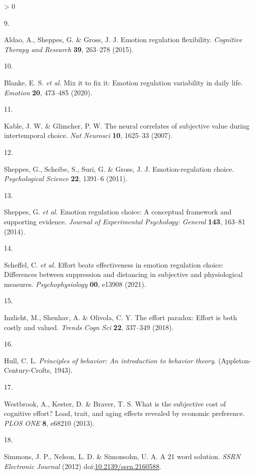 \documentclass[
  english,
  man,floatsintext]{apa6}
\newlength{\cslhangindent}
\newlength{\csllabelwidth}
\newenvironment{CSLReferences}[2] %
 {%
  \setlength{\parindent}{0pt}
  \ifodd #1 \everypar{\setlength{\hangindent}{\cslhangindent}}\ignorespaces\fi
  \ifnum #2 > 0
  \setlength{\parskip}{#2\baselineskip}
  \fi
 }%
 {}
\newcommand{\CSLLeftMargin}[1]{\parbox[t]{\csllabelwidth}{#1}}
\newcommand{\CSLRightInline}[1]{\parbox[t]{\linewidth - \csllabelwidth}{#1}\break}
\begin{document}
\begin{CSLReferences}{0}{0}
\leavevmode\hypertarget{ref-Aldao2015}{}%
\CSLLeftMargin{9. }
\CSLRightInline{Aldao, A., Sheppes, G. \& Gross, J. J. Emotion regulation flexibility. \emph{Cognitive Therapy and Research} \textbf{39}, 263--278 (2015).}

\leavevmode\hypertarget{ref-Blanke2020}{}%
\CSLLeftMargin{10. }
\CSLRightInline{Blanke, E. S. \emph{et al.} Mix it to fix it: Emotion regulation variability in daily life. \emph{Emotion} \textbf{20}, 473--485 (2020).}

\leavevmode\hypertarget{ref-Kable2007}{}%
\CSLLeftMargin{11. }
\CSLRightInline{Kable, J. W. \& Glimcher, P. W. The neural correlates of subjective value during intertemporal choice. \emph{Nat Neurosci} \textbf{10}, 1625--33 (2007).}

\leavevmode\hypertarget{ref-Sheppes2011}{}%
\CSLLeftMargin{12. }
\CSLRightInline{Sheppes, G., Scheibe, S., Suri, G. \& Gross, J. J. Emotion-regulation choice. \emph{Psychological Science} \textbf{22}, 1391--6 (2011).}

\leavevmode\hypertarget{ref-Sheppes2014}{}%
\CSLLeftMargin{13. }
\CSLRightInline{Sheppes, G. \emph{et al.} Emotion regulation choice: A conceptual framework and supporting evidence. \emph{Journal of Experimental Psychology: General} \textbf{143}, 163--81 (2014).}

\leavevmode\hypertarget{ref-Scheffel2021}{}%
\CSLLeftMargin{14. }
\CSLRightInline{Scheffel, C. \emph{et al.} Effort beats effectiveness in emotion regulation choice: Differences between suppression and distancing in subjective and physiological measures. \emph{Psychophysiology} \textbf{00}, e13908 (2021).}

\leavevmode\hypertarget{ref-Inzlicht2018}{}%
\CSLLeftMargin{15. }
\CSLRightInline{Inzlicht, M., Shenhav, A. \& Olivola, C. Y. The effort paradox: Effort is both costly and valued. \emph{Trends Cogn Sci} \textbf{22}, 337--349 (2018).}

\leavevmode\hypertarget{ref-Hull1943}{}%
\CSLLeftMargin{16. }
\CSLRightInline{Hull, C. L. \emph{Principles of behavior: An introduction to behavior theory}. (Appleton-Century-Crofts, 1943).}

\leavevmode\hypertarget{ref-Westbrook2013}{}%
\CSLLeftMargin{17. }
\CSLRightInline{Westbrook, A., Kester, D. \& Braver, T. S. What is the subjective cost of cognitive effort? {Load}, trait, and aging effects revealed by economic preference. \emph{PLOS ONE} \textbf{8}, e68210 (2013).}

\leavevmode\hypertarget{ref-Simmons2012}{}%
\CSLLeftMargin{18. }
\CSLRightInline{Simmons, J. P., Nelson, L. D. \& Simonsohn, U. A. A 21 word solution. \emph{SSRN Electronic Journal} (2012) doi:\href{https://doi.org/10.2139/ssrn.2160588}{10.2139/ssrn.2160588}.}


\end{CSLReferences}
\end{document}
